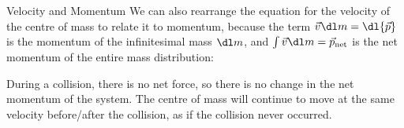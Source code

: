 \documentclass[12pt,compress,aspectratio=169]{beamer}
\begin{document}
\begin{frame}{Velocity and Momentum}
  We can also rearrange the equation for the velocity of the centre of mass to
  relate it to momentum, because the term $\vec v\dl m=\dl{\vec p}$ is the
  momentum of the infinitesimal mass $\dl m$, and
  $\int\vec v\dl m=\vec p_\text{net}$ is the net momentum of the entire mass
  distribution:
  

  During a collision, there is no net force, so there is no change in the net
  momentum of the system. The centre of mass will continue to move at the same
  velocity before/after the collision, as if the collision never occurred.
\end{frame}
\end{document}
